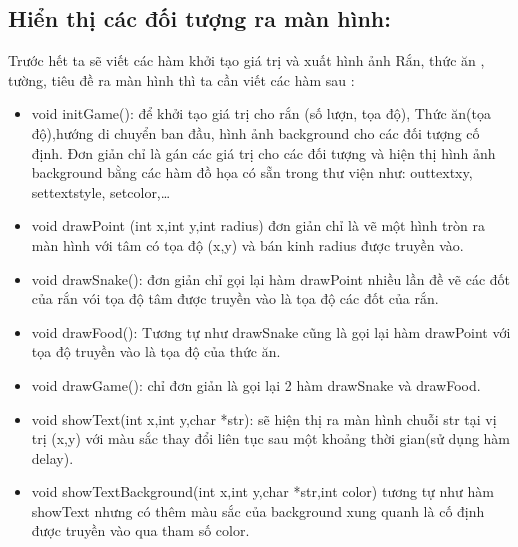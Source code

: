 \documentclass[13pt,a4paper]{article}
\begin{document}
\subsection{Hiển thị các đối tượng ra màn hình:}
\indent Trước hết ta sẽ viết các hàm khởi tạo giá trị và xuất hình ảnh Rắn, thức ăn , tường, tiêu đề ra màn hình thì ta cần viết các hàm sau :
\begin{itemize}

\item void initGame(): để khởi tạo giá trị cho rắn (số lượn, tọa độ), Thức ăn(tọa độ),hướng di chuyển ban đầu, hình ảnh background cho các đối tượng cố định. Đơn giản chỉ là gán các giá trị cho các đối tượng và hiện thị hình ảnh background bằng các hàm đồ họa có sẵn trong thư viện như: outtextxy, settextstyle, setcolor,…
\item void drawPoint (int x,int y,int radius) đơn giản chỉ là vẽ một hình tròn ra màn hình với tâm có tọa độ (x,y) và bán kinh radius được truyền vào.
\item void drawSnake(): đơn giản chỉ gọi lại hàm drawPoint nhiều lần đề vẽ các đốt của rắn vói tọa độ tâm được truyền vào là tọa độ các đốt của rắn.
\item void drawFood(): Tương tự như drawSnake cũng là gọi lại hàm drawPoint với tọa độ truyền vào là tọa độ của thức ăn.
\item void drawGame(): chỉ đơn giản là gọi lại 2 hàm drawSnake và drawFood.
\item void showText(int x,int y,char *str): sẽ hiện thị ra màn hình chuỗi str tại vị trị (x,y) với màu sắc thay đổi liên tục sau một khoảng thời gian(sử dụng hàm delay).
\item void showTextBackground(int x,int y,char *str,int color) tương tự như hàm showText nhưng có thêm màu sắc của background xung quanh là cố định được truyền vào qua tham số color.

\end{itemize}
\end{document}
